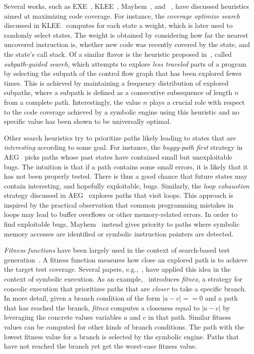 Several works, such as {\sc EXE}~\cite{EXE-CCS06}, {\sc KLEE}~\cite{KLEE-OSDI08}, {\sc Mayhem}~\cite{MAYHEM-SP12}, and {\sc \stwoe}~\cite{CKC-TOCS12}, have discussed heuristics aimed at maximizing code coverage. For instance, the {\em coverage optimize search} discussed in {\sc KLEE}~\cite{KLEE-OSDI08} computes for each state a weight, which is later used to randomly select states. The weight is obtained by considering how far the nearest uncovered instruction is, whether new code was recently covered by the state, and the state's call stack. Of a similar flavor is the heuristic proposed in~\cite{LZL-OOPSLA13}, called {\em subpath-guided search}, which attempts to explore {\it less traveled} parts of a program by selecting the subpath of the control flow graph that has been explored fewer times. This is achieved by maintaining a frequency distribution of explored subpaths, where a subpath is defined as a consecutive subsequence of length $n$ from a complete path. Interestingly, the value $n$ plays a crucial role with respect to the code coverage achieved by a symbolic engine using this heuristic and no specific value has been shown to be universally optimal.

Other search heuristics try to prioritize paths likely leading to states that are {\em interesting} according to some goal. For instance, the {\em buggy-path first} strategy in {\sc AEG}~\cite{AEG-NDSS11} picks paths whose past states have contained small but unexploitable bugs. The intuition is that if a path contains some small errors, it is likely that it has not been properly tested. There is thus a good chance that future states may contain interesting, and hopefully exploitable, bugs. Similarly, the {\em loop exhaustion} strategy discussed in {\sc AEG}~\cite{AEG-NDSS11} explores paths that visit loops. This approach is inspired by the practical observation that common programming mistakes in loops may lead to buffer overflows or other memory-related errors. In order to find exploitable bugs, {\sc Mayhem}~\cite{MAYHEM-SP12} instead gives priority to paths where symbolic memory accesses are identified or symbolic instruction pointers are detected. 

{\em Fitness functions} have been largely used in the context of search-based test generation~\cite{M-STVR04}. %
A fitness function measures how close an explored path is to achieve the target test coverage. Several papers, e.g.,~\cite{XTD-DSN09,CS-CACM13,XTD-DSN09}, have applied this idea in the context of symbolic execution. As an example,~\cite{XTD-DSN09} introduces {\em fitnex}, a strategy for concolic execution that prioritizes paths that are {\em closer} to take a specific branch. In more detail, given a branch condition of the form $|a - c| == 0$ and a path that has reached the branch, {\em fitnex} computes a closeness equal to $|a - c|$ by leveraging the concrete values  variables $a$ and $c$ in that path. Similar fitness values can be computed for other kinds of branch conditions. The path with the lowest fitness value for a branch is selected by the symbolic engine. Paths that have not reached the branch yet get the worst-case fitness value.

